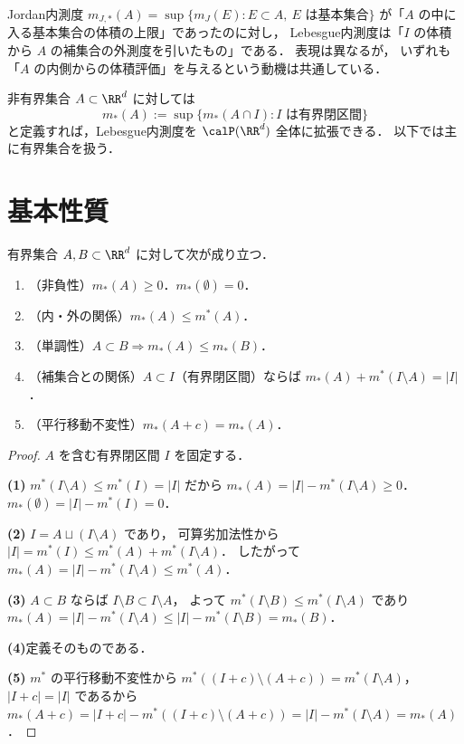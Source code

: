 \begin{remark}
Jordan内測度
$m_{J,*}(A) = \sup\{m_J(E) : E \subset A,\ E \text{ は基本集合}\}$
が「$A$ の中に入る基本集合の体積の上限」であったのに対し，
Lebesgue内測度は「$I$ の体積から $A$ の補集合の外測度を引いたもの」である．
表現は異なるが，
いずれも「$A$ の内側からの体積評価」を与えるという動機は共通している．
\end{remark}

\begin{remark}[非有界集合への拡張]\label{rem:inner-unbounded}
非有界集合 $A \subset \RR^d$ に対しては
\[
m_*(A) := \sup\{m_*(A \cap I) : I \text{ は有界閉区間}\}
\]
と定義すれば，Lebesgue内測度を $\calP(\RR^d)$ 全体に拡張できる．
以下では主に有界集合を扱う．
\end{remark}

\section{基本性質}\label{sec:lebesgue-inner-prop}

\begin{theorem}[Lebesgue内測度の性質]\label{thm:lebesgue-inner-properties}
有界集合 $A, B \subset \RR^d$ に対して次が成り立つ．
\begin{enumerate}
\item （非負性）$m_*(A) \ge 0$．$m_*(\emptyset) = 0$．
\item （内・外の関係）$m_*(A) \le m^*(A)$．
\item （単調性）$A \subset B \Rightarrow m_*(A) \le m_*(B)$．
\item （補集合との関係）$A \subset I$（有界閉区間）ならば
$m_*(A) + m^*(I \setminus A) = |I|$．
\item （平行移動不変性）$m_*(A + c) = m_*(A)$．
\end{enumerate}
\end{theorem}
\begin{proof}
$A$ を含む有界閉区間 $I$ を固定する．

\textbf{(1)}\quad
$m^*(I \setminus A) \le m^*(I) = |I|$ だから
$m_*(A) = |I| - m^*(I \setminus A) \ge 0$．
$m_*(\emptyset) = |I| - m^*(I) = 0$．

\textbf{(2)}\quad
$I = A \sqcup (I \setminus A)$ であり，
可算劣加法性から
$|I| = m^*(I) \le m^*(A) + m^*(I \setminus A)$．
したがって
$m_*(A) = |I| - m^*(I \setminus A) \le m^*(A)$．

\textbf{(3)}\quad
$A \subset B$ ならば $I \setminus B \subset I \setminus A$，
よって $m^*(I \setminus B) \le m^*(I \setminus A)$ であり
$m_*(A) = |I| - m^*(I \setminus A) \le |I| - m^*(I \setminus B) = m_*(B)$．

\textbf{(4)}\quad 定義そのものである．

\textbf{(5)}\quad
$m^*$ の平行移動不変性から
$m^*((I+c) \setminus (A+c)) = m^*(I \setminus A)$，
$|I + c| = |I|$ であるから
$m_*(A+c) = |I+c| - m^*((I+c) \setminus (A+c))
= |I| - m^*(I \setminus A) = m_*(A)$．
\end{proof}

